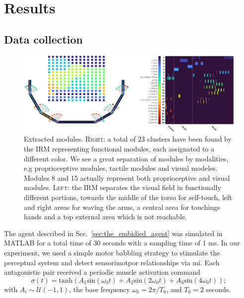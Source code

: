 \section{Results}

\subsection{Data collection}
\begin{figure}[t!]
    \centering
    \includegraphics[height=.35\textwidth]{fig/modules_total.png}
    \caption{Extracted modules. \textsc{Right}: a total of 23 clusters have been found by the IRM representing functional modules, each assignated to a different color. We see a great separation of modules by modalities, e.g proprioceptive modules, tactile modules and visual modeles. Modules 8 and 15 actually represent both proprioceptive and visual modules. \textsc{Left}: the IRM separates the visual field in functionally different portions, towards the middle of the torso for self-touch, left and right areas for waving the arms, a central area for touchings hands and a top external area which is not reachable.}
    \label{fig:modules}
\end{figure}

The agent described in Sec.~\ref{sec:the_embidied_agent} was simulated in MATLAB for a total time of 30 seconds with a sampling time of 1 ms. In our experiment, we used a simple motor babbling strategy to stimulate the perceptual system and detect sensorimotpor relationships via \ac{mi}. Each antagonistic pair received a periodic muscle activation command
\begin{equation}\label{eq:motor_babbling_torques}
	\sigma(t) =  \text{tanh} \left( A_1 \text{sin}\left(\omega_0 t\right) + A_2 \text{sin}\left(2\omega_0 t\right) + A_3 \text{sin}\left(4\omega_0 t\right) \right);
\end{equation}	
with $A_i \sim \mathcal{U}(-1,1)$, the base frequency $\omega_0 = 2\pi/T_0$, and $T_0=2$ seconds.

